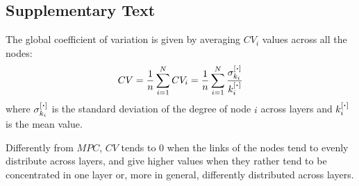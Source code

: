 
%
%
%
%
%

\renewcommand{\thefigure}{S\arabic{figure}}
\renewcommand{\thetable}{S\arabic{table}}
\renewcommand{\theequation}{S\arabic{equation}}

\setcounter{figure}{0}
\setcounter{table}{0}
\setcounter{equation}{0}

%
\subsection*{Supplementary Text} \label{subsec:TextS}

The global coefficient of variation is given by averaging $CV_i$ values across all the nodes:
\begin{equation}
	CV = \frac{1}{n} \sum_{i=1}^{N} CV_i
	= \frac{1}{n} \sum_{i=1}^{N} \frac{\sigma_{k_i}^{[\bigcdot]}}{k_i^{[\bigcdot]}}
	\label{eq:cv}
\end{equation}
where $\sigma_{k_i}^{[\bigcdot]}$ is the standard deviation of the degree of node $i$ across layers and $k_i^{[\bigcdot]}$ is the mean value.

Differently from $MPC$, $CV$ tends to $0$ when the links of the nodes tend to evenly distribute across layers, and give higher values when they rather tend to be concentrated in one layer or, more in general, differently distributed across layers.

%